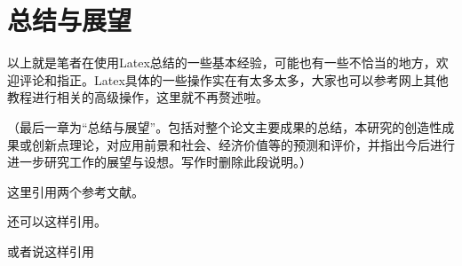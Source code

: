 \chapter{总结与展望}


以上就是笔者在使用Latex总结的一些基本经验，可能也有一些不恰当的地方，欢迎评论和指正。Latex具体的一些操作实在有太多太多，大家也可以参考网上其他教程进行相关的高级操作，这里就不再赘述啦。

（最后一章为“总结与展望”。包括对整个论文主要成果的总结，本研究的创造性成果或创新点理论，对应用前景和社会、经济价值等的预测和评价，并指出今后进行进一步研究工作的展望与设想。写作时删除此段说明。）

这里引用两个参考文献\cite{2001Applying}\cite{2004PSO_ZhangLibiao}。

还可以这样引用\cite{2001Applying,2021A}。

或者说这样引用\cite{2001Applying,2004PSO_ZhangLibiao,2021A}
